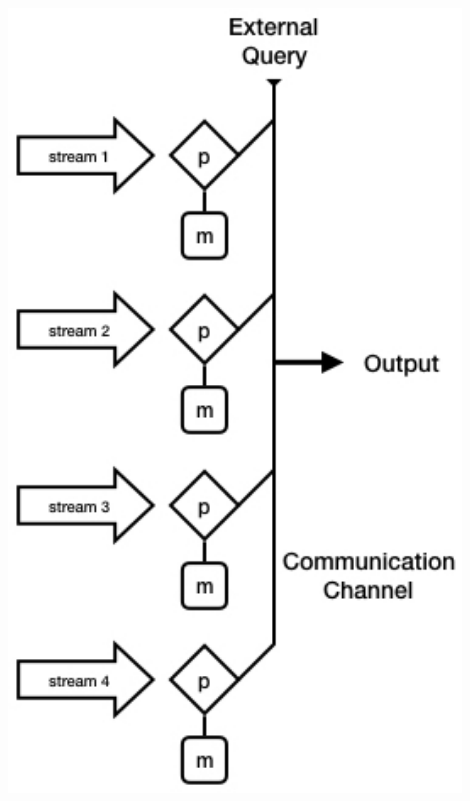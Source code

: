\documentclass{beamer}
\begin{document}
\begin{frame}
\begin{columns}
\begin{column}{0.4\textwidth}
\begin{center}
	\includegraphics[width=0.9\textwidth]{dist_stream_model}
\end{center}
\end{column}

\end{columns}
\end{frame}

\end{document}
